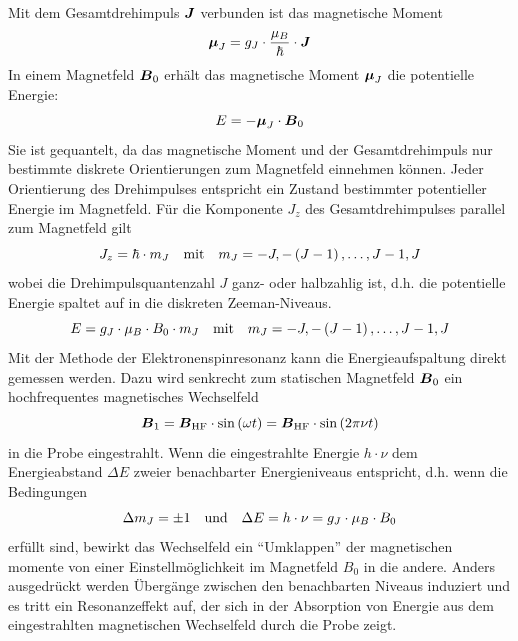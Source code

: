 \documentclass[ngerman]{scrartcl}
\begin{document}
Mit dem Gesamtdrehimpuls $\vb*{J}$ verbunden ist das magnetische Moment
\begin{equation}
    \vb*{\mu}_J = g_J \cdot \frac{\mu_B}{\hbar}\cdot \vb*{J}
\end{equation}
In einem Magnetfeld $\vb*{B}_0$ erhält das magnetische Moment $\vb*{\mu}_J$ die potentielle Energie:
\begin{equation}
    E = - \vb*{\mu}_J \cdot \vb*{B}_0
\end{equation}
Sie ist gequantelt, da das magnetische Moment und der Gesamtdrehimpuls nur bestimmte diskrete Orientierungen zum Magnetfeld einnehmen können. Jeder Orientierung des Drehimpulses entspricht ein Zustand bestimmter potentieller Energie im Magnetfeld. Für die Komponente $J_z$ des Gesamtdrehimpulses parallel zum Magnetfeld gilt
\begin{equation}
    J_z = \hbar \cdot m_J \qq{mit} m_J = -J, -\left(J-1\right), \dots, J-1, J
\end{equation}
wobei die Drehimpulsquantenzahl $J$ ganz- oder halbzahlig ist, d.h. die potentielle Energie spaltet auf in die diskreten Zeeman-Niveaus.
\begin{equation}
    E = g_J \cdot \mu_B \cdot B_0 \cdot m_J \qq{mit} m_J = -J, -\left(J-1\right), \dots, J-1, J
\end{equation}
Mit der Methode der Elektronenspinresonanz kann die Energieaufspaltung direkt gemessen werden. Dazu wird senkrecht zum statischen Magnetfeld $\vb*{B}_0$ ein hochfrequentes magnetisches Wechselfeld
\begin{equation}
    \vb*{B}_1 = \vb*{B}_{\text{HF}} \cdot \sin\left(\omega t\right) = \vb*{B}_{\text{HF}} \cdot \sin\left(2 \pi \nu t\right)
\end{equation}
in die Probe eingestrahlt. Wenn die eingestrahlte Energie $h \cdot \nu$ dem Energieabstand $\Delta E$ zweier benachbarter Energieniveaus entspricht, d.h. wenn die Bedingungen
\begin{equation}
    \label{eq:V}
    \Delta m_J = \pm 1 \qq{und} \Delta E = h \cdot \nu = g_J \cdot \mu_B \cdot B_0
\end{equation}
erfüllt sind, bewirkt das Wechselfeld ein \enquote{Umklappen} der magnetischen momente von einer Einstellmöglichkeit im Magnetfeld $B_0$ in die andere. Anders ausgedrückt werden Übergänge zwischen den benachbarten Niveaus induziert und es tritt ein Resonanzeffekt auf, der sich in der Absorption von Energie aus dem eingestrahlten magnetischen Wechselfeld durch die Probe zeigt.
%
\end{document}

